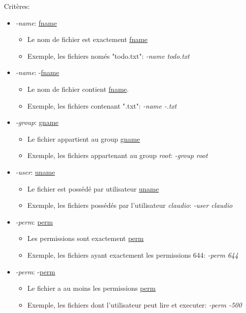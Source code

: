 \documentclass[11pt, a4paper]{article}
\begin{document}
Critères:
\begin{itemize}
	\renewcommand\labelitemi{}
	\renewcommand\labelitemii{}
	\renewcommand\labelitemiii{}
	\item \textit{-name}: \underline{fname}
	\begin{itemize}
		\item Le nom de fichier est exactement \underline{fname}
		\item Exemple, les fichiers només  "todo.txt": \textit{-name todo.txt}
	\end{itemize}
	\item \textit{-name}: -\underline{fname}
	\begin{itemize}
		\item     Le nom de fichier contient \underline{fname}.
		\item     Exemple, les fichiers contenant ".txt":
		\textit{-name -.txt}
	\end{itemize}
	\item \textit{-group}: \underline{gname}
	\begin{itemize}
		\item 	   	Le fichier appartient au group \underline{gname}
		\item 	   	Exemple, les fichiers appartenant au group \textit{root}: \textit{-group root}
	\end{itemize}
	\item \textit{-user}: \underline{uname}
	\begin{itemize}
		\item 		Le fichier est possédé par utilisateur \underline{uname}
		\item 	   	Exemple, les fichiers possédés par l'utilisateur \textit{claudio}: \textit{-user claudio}
	\end{itemize}
	\item \textit{-perm}: \underline{perm}
	\begin{itemize}
		\item 		Les permissions sont exactement \underline{perm}
		\item 		Exemple, les fichiers ayant exactement les permissions 644: \textit{-perm 644}
	\end{itemize}
	\item \textit{-perm}: -\underline{perm}
	\begin{itemize}
		\item 		Le fichier a au moins les permissions \underline{perm}
		\item 		Exemple, les fichiers dont l'utilisateur peut lire et executer: \textit{-perm -500}

\end{itemize}
\end{itemize}
\end{document}
